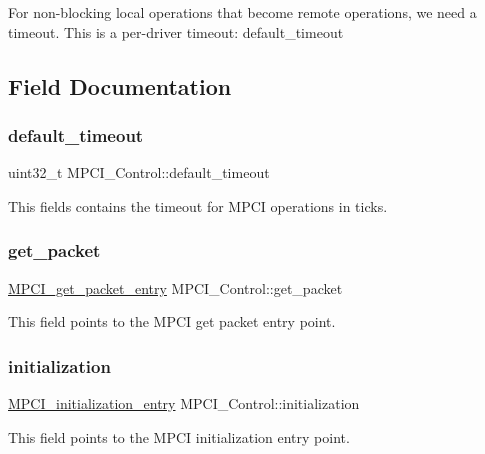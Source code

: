 For non-\/blocking local operations that become remote operations, we need a timeout. This is a per-\/driver timeout\+: default\+\_\+timeout 

\subsection{Field Documentation}
\mbox{\label{structMPCI__Control_a8bbaadcf3dbc6a89d973d7600f294366}} 
\subsubsection{\texorpdfstring{default\_timeout}{default\_timeout}}
{\footnotesize\ttfamily uint32\+\_\+t M\+P\+C\+I\+\_\+\+Control\+::default\+\_\+timeout}

This fields contains the timeout for M\+P\+CI operations in ticks. \mbox{\label{structMPCI__Control_af9c8d69c57f2689006a0b8c4d39e4070}} 
\subsubsection{\texorpdfstring{get\_packet}{get\_packet}}
{\footnotesize\ttfamily \mbox{\hyperlink{group__RTEMSScoreMPCI_gaff830d8b635714b2f669bfe612744244}{M\+P\+C\+I\+\_\+get\+\_\+packet\+\_\+entry}} M\+P\+C\+I\+\_\+\+Control\+::get\+\_\+packet}

This field points to the M\+P\+CI get packet entry point. \mbox{\label{structMPCI__Control_a9a1562088b03129f4cc90818fdf168be}} 
\subsubsection{\texorpdfstring{initialization}{initialization}}
{\footnotesize\ttfamily \mbox{\hyperlink{group__RTEMSScoreMPCI_ga40ecc89f5ace847ed93f57e06ef0f27c}{M\+P\+C\+I\+\_\+initialization\+\_\+entry}} M\+P\+C\+I\+\_\+\+Control\+::initialization}

This field points to the M\+P\+CI initialization entry point. \mbox{\label{structMPCI__Control_a9d941e28d8d0c332fc3ce5d700ed0487}} 
